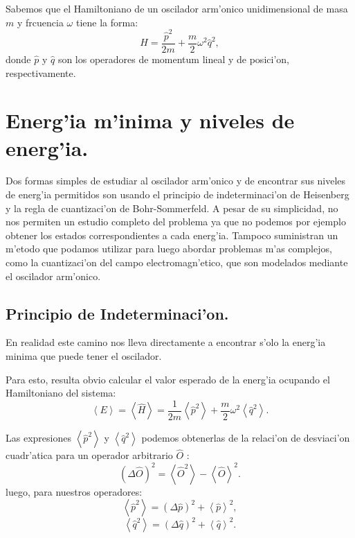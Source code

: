 Sabemos que el Hamiltoniano de un oscilador arm'onico unidimensional de
masa $m$ y frcuencia $\omega$ tiene la forma:%
\begin{equation}
H=\frac{\hat{p}^{2}}{2m}+\frac{m}{2}\omega^{2}\hat{q}^{2},
\end{equation}
donde $\hat{p}$ y $\hat{q}$ son los operadores de momentum lineal y de posici'on, respectivamente.

\section{Energ'ia m'inima y niveles de energ'ia.}

Dos formas simples de estudiar al oscilador arm'onico y de encontrar sus
niveles de energ'ia permitidos son usando el principio de
indeterminaci'on de Heisenberg y la regla de cuantizaci'on de
Bohr-Sommerfeld. A pesar de su simplicidad, no nos permiten un estudio
completo del problema ya que no podemos por ejemplo obtener los estados
correspondientes a cada energ'ia. Tampoco suministran un m'etodo que
podamos utilizar para luego abordar problemas m'as complejos, como la
cuantizaci'on del campo electromagn'etico, que son modelados mediante el
oscilador arm'onico.

\subsection{Principio de Indeterminaci'on.}

En realidad este camino nos lleva directamente a encontrar s'olo la
energ'ia minima que puede tener el oscilador.

Para esto, resulta obvio calcular el valor esperado de la energ'ia
ocupando el Hamiltoniano del sistema:%
\begin{equation}
\left\langle E\right> =\left\langle \hat{H}\right> =\frac{1}%
{2m}\left\langle \hat{p}^{2}\right> +\frac{m}{2}\omega^{2}\left\langle
\hat{q}^{2}\right> . \label{ValEspEa}
\end{equation}


Las expresiones $\left\langle \hat{p}^{2}\right> $ y $\left\langle
\hat{q}^{2}\right> $ podemos obtenerlas de la relaci'on de
desviaci'on cuadr'atica para un operador arbitrario $\hat{O}$ :
\begin{equation}
\left( \Delta\hat{O}\right) ^{2}=\left\langle \hat{O}^{2}\right>
-\left\langle \hat{O}\right> ^{2} .
\end{equation}
luego, para nuestros operadores:%
\begin{equation}
\left\langle \hat{p}^{2}\right> =\left( \Delta\hat{p}\right)
^{2}+\left\langle \hat{p}\right> ^{2},\label{DesCuaP2}
\end{equation}
\begin{equation}
\left\langle \hat{q}^{2}\right> =\left( \Delta\hat{q}\right)
^{2}+\left\langle \hat{q}\right> ^{2}.\label{DesCuaQ2}
\end{equation}


